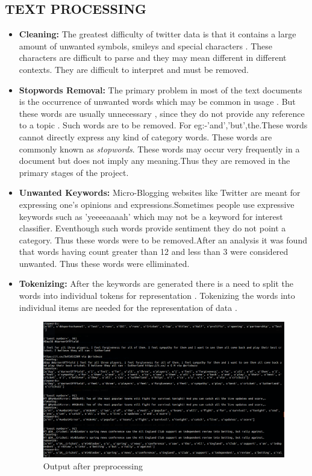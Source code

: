 \subsection{TEXT PROCESSING}
\par
\begin{itemize}

\item \textbf{Cleaning:}
\indent 
The greatest difficulty of twitter data is that it contains a large amount of unwanted symbols, smileys and special characters . These characters are difficult to parse and they may mean different in different contexts. They are difficult to interpret and must be removed. 

\item \textbf{Stopwords Removal:}
\indent 
The primary problem in most of the text documents is the occurrence of unwanted words which may be common in usage . But these words are usually unnecessary , since they do not provide any reference to a topic . Such words are to be removed. For eg:-'and','but',the.These words cannot directly express any kind of category words.
These words are commonly known as \textit{stopwords}. These words may occur very frequently in a document but does not imply any meaning.Thus they are removed in the primary stages of the project.

\item \textbf{Unwanted Keywords:}\indent
Micro-Blogging websites like Twitter are meant for expressing one's
opinions and expressions.Sometimes people use expressive keywords such as 'yeeeeaaaah' which may not be a keyword for interest classifier.  Eventhough such words provide sentiment they do not point a category. Thus these words were to be removed.After an analysis it was found that words having count greater than 12 and less than 3 were considered unwanted. Thus these words were elliminated.

\item \textbf{Tokenizing:}
\indent 
After the keywords are generated there is a need to split the words into individual tokens for representation . Tokenizing the words  into individual items are needed for the representation of data . 

\begin{figure}[!ht]
	\centering
	\includegraphics[width=0.9\linewidth]{preprocess.png}
	\caption{Output after preprocessing}
	\label{fig:expression01}
\end{figure}


\end{itemize}
